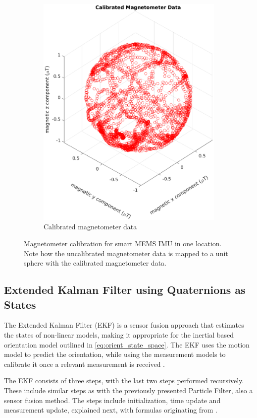 \begin{figure}[H]
\begin{subfigure}[t]{0.45\textwidth}
		\includegraphics[trim=80 0 80 0, clip,width=1.1\linewidth]{images/20201020_1125_Calibrated_Magnetometer_Data}
		\caption{ Calibrated magnetometer data}
		\label{fig:calibrated_magnetometer_data}
	\end{subfigure}
\setlength{\belowcaptionskip}{-20pt}
	\caption{Magnetometer calibration for smart MEMS \ac{IMU} in one location. Note how the uncalibrated magnetometer data is mapped to a unit sphere with the calibrated magnetometer data.}
	\label{fig:calibration_magnetometer}
\end{figure}



\subsection{Extended Kalman Filter using Quaternions as States}
\label{sec:rw-EKF}

The Extended Kalman Filter (EKF) is a sensor fusion approach that estimates the states of non-linear models, making it appropriate for the inertial based orientation model outlined in \eqref{eq:orient_state_space}. The EKF uses the motion model to predict the orientation, while using the measurement models to calibrate it once a relevant measurement is received \cite{Kok2017}. \par 
The EKF consists of three steps, with the last two steps performed recursively.  These include similar steps as with the previously presented Particle Filter, also a sensor fusion method. The steps include initialization, time update and measurement update, explained next, with formulas originating from \cite{Kok2017}. \par 

